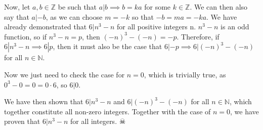 \documentclass[12pt]{amsart}
\def\ZZ{{\mathbb Z}}
\def\NN{{\mathbb N}}
\begin{document}
Now, let $a, b \in \ZZ$ be such that $a | b \implies b = ka$ for some $k \in \ZZ$. We can then also say that $a | -b$, as we can choose $m = -k$ so that $-b = ma = -ka$. We have already demonstrated that $6 | n^3 - n$ for all positive integers n. $n^3 - n$ is an odd function, so if $n^3 - n = p$, then $(-n)^3 - (-n) = -p$. Therefore, if $6 | n^3 - n \implies 6 | p$, then it must also be the case that $6 | -p \implies 6 | (-n)^3 - (-n)$ for all $n \in \NN$.

Now we just need to check the case for $n = 0$, which is trivially true, as $0^3 - 0 = 0 = 0 \cdot 6$, so $6 | 0$. 

We have then shown that $6 | n^3 - n$ and $6 | (-n)^3 - (-n)$ for all $n \in \NN$, which together constitute all non-zero integers. Together with the case of $n = 0$, we have proven that $6 | n^3 - n$ for all integers. $\skull$

\bigskip
\end{document}
